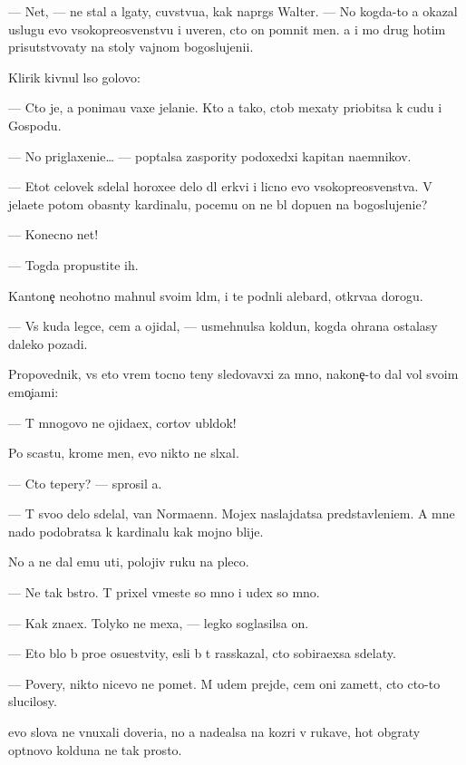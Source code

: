 \documentclass[10pt]{book}
\begin{document}
— Net, — ne stal {\y}a lgaty, cuvstvu{\y}a, kak napr{\ia}gs{\ia} Walter. — No kogda-to {\y}a okazal uslugu {\y}evo v{\yi}sokopreosv{\ia}{\x}enstvu i uveren, cto on pomnit men{\ia}. {\Y}a i mo{\y} drug hotim prisutstvovaty na stoly vajnom bogoslujeni{\y}i.

Klirik kivnul l{\yi}so{\y} golovo{\y}:

— Cto je, {\y}a ponima{\y}u vaxe jelani{\y}e. Kto {\y}a tako{\y}, ctob{\yi} mexaty priob{\x}itsa k cudu i Gospodu.

— No priglaxeni{\y}e… — pop{\yi}talsa zaspority podoxedxi{\y} kapitan na{\y}emnikov.

— Etot celovek sdelal horoxe{\y}e delo dl{\ia} {\C}erkvi i licno {\y}evo v{\yi}sokopreosv{\ia}{\x}enstva. V{\yi} jela{\y}ete potom ob{\y}asn{\ia}ty kardinalu, pocemu on ne b{\yi}l dopu{\x}en na bogoslujeni{\y}e?

— Konecno net!

— Togda propustite ih.

Kantone{\c} neohotno mahnul svo{\y}im l{\iu}d{\ia}m, i te podn{\ia}li alebard{\yi}, otkr{\yi}va{\y}a dorogu.

— Vs{\e} kuda legce, cem {\y}a ojidal, — usmehnulsa koldun, kogda ohrana ostalasy daleko pozadi.

Propovednik, vs{\e} eto vrem{\ia} tocno teny sledovavxi{\y} za mno{\y}, nakone{\c}-to dal vol{\iu} svo{\y}im emo{\c}i{\y}ami:

— T{\yi} mnogovo ne ojida{\y}ex, cortov ubl{\iu}dok!

Po scast{\y}u, krome men{\ia}, {\y}evo nikto ne sl{\yi}xal.

— Cto tepery? — sprosil {\y}a.

— T{\yi} svo{\y}o delo sdelal, van Normaenn. Mojex naslajdatsa predstavleni{\y}em. A mne nado podobratsa k kardinalu kak mojno blije.

No {\y}a ne dal {\y}emu u{\y}ti, polojiv ruku na pleco.

— Ne tak b{\yi}stro. T{\yi} prixel vmeste so mno{\y} i u{\y}dex so mno{\y}.

— Kak zna{\y}ex. Tolyko ne mexa{\y}, — legko soglasilsa on.

— Eto b{\yi}lo b{\yi} pro{\x}e osu{\x}estvity, {\y}esli b{\yi} t{\yi} rasskazal, cto sobira{\y}exsa sdelaty.

— Povery, nikto nicevo ne po{\y}met. M{\yi} u{\y}dem prejde, cem oni zamet{\ia}t, cto cto-to slucilosy.

{\Y}evo slova ne vnuxali doveri{\y}a, no {\y}a nade{\y}alsa na koz{\yi}ri v rukave, hot{\ia} ob{\yi}graty op{\yi}tnovo kolduna ne tak prosto.
\end{document}
